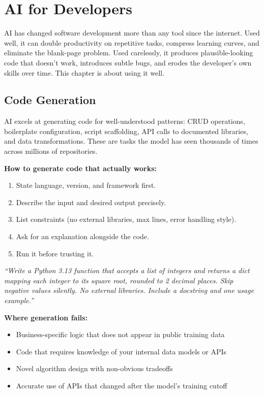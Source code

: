 \chapter{AI for Developers}
\label{ch:developers}

AI has changed software development more than any tool since the internet.
Used well, it can double productivity on repetitive tasks, compress learning curves, and
eliminate the blank-page problem.
Used carelessly, it produces plausible-looking code that doesn't work, introduces subtle
bugs, and erodes the developer's own skills over time.
This chapter is about using it well.

\section{Code Generation}
\label{sec:codegen}

AI excels at generating code for well-understood patterns: CRUD operations, boilerplate
configuration, script scaffolding, API calls to documented libraries, and data
transformations.
These are tasks the model has seen thousands of times across millions of repositories.

\textbf{How to generate code that actually works:}
\begin{enumerate}
  \item State language, version, and framework first.
  \item Describe the input and desired output precisely.
  \item List constraints (no external libraries, max lines, error handling style).
  \item Ask for an explanation alongside the code.
  \item Run it before trusting it.
\end{enumerate}

\begin{tipbox}
\textit{``Write a Python 3.13 function that accepts a list of integers and returns a
dict mapping each integer to its square root, rounded to 2 decimal places. Skip
negative values silently. No external libraries. Include a docstring and one usage
example.''}
\end{tipbox}

\textbf{Where generation fails:}
\begin{itemize}
  \item Business-specific logic that does not appear in public training data
  \item Code that requires knowledge of your internal data models or APIs
  \item Novel algorithm design with non-obvious tradeoffs
  \item Accurate use of APIs that changed after the model's training cutoff
\end{itemize}

